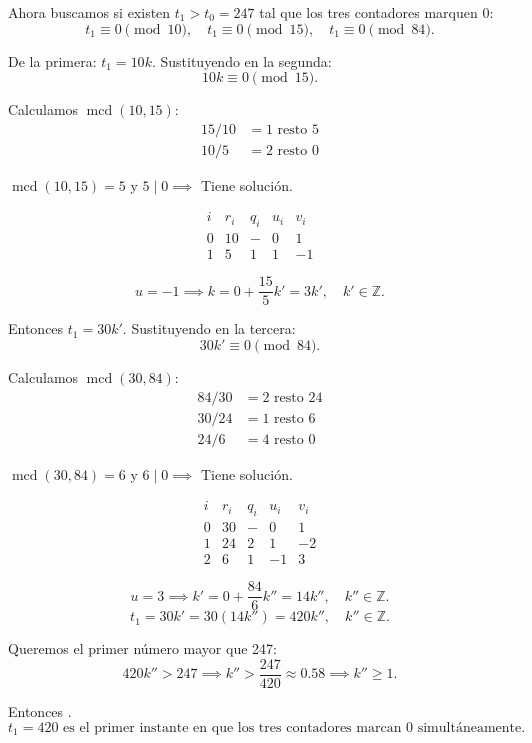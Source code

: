 \documentclass[a4paper,12pt]{article}
\begin{document}
\begin{ejercicio}[title=Ejercicio 41]

Ahora buscamos si existen $t_1 > t_0 = 247$ tal que los tres contadores marquen $0$:
\[
t_1 \equiv 0 \pmod{10}, \quad t_1 \equiv 0 \pmod{15}, \quad t_1 \equiv 0 \pmod{84}.
\]

De la primera: $t_1 = 10 k$. Sustituyendo en la segunda:
\[
10 k \equiv 0 \pmod{15}.
\]

Calculamos \(\operatorname{mcd}(10,15)\):
\begin{align*}
15 / 10 &= 1 \text{ resto } \boxed{5} \\
10 / 5  &= 2 \text{ resto } 0
\end{align*}

\(\operatorname{mcd}(10,15) = 5\) y $5 \mid 0 \implies$ Tiene solución.

\[
\begin{array}{c|c|c|c|c}
i & r_i & q_i & u_i & v_i \\
\hline
0 & 10 & - & 0 & 1 \\
1 & \boxed{5} & 1 & 1 & -1
\end{array}
\]

\[
u = -1 \implies k = 0 + \frac{15}{5} k' = 3 k', \quad k' \in \mathbb{Z}.
\]

Entonces $t_1 = 30 k'$. Sustituyendo en la tercera:
\[
30 k' \equiv 0 \pmod{84}.
\]

Calculamos \(\operatorname{mcd}(30,84)\):
\begin{align*}
84 / 30 &= 2 \text{ resto } 24 \\
30 / 24 &= 1 \text{ resto } \boxed{6} \\
24 / 6 &= 4 \text{ resto } 0
\end{align*}

\(\operatorname{mcd}(30,84) = 6\) y $6 \mid 0 \implies$ Tiene solución.

\[
\begin{array}{c|c|c|c|c}
i & r_i & q_i & u_i & v_i \\
\hline
0 & 30 & - & 0 & 1 \\
1 & 24 & 2 & 1 & -2 \\
2 & \boxed{6} & 1 & -1 & 3
\end{array}
\]

\[
u = 3 \implies k' = 0 + \frac{84}{6} k'' = 14 k'', \quad k'' \in \mathbb{Z}.
\]
\[
t_1 = 30 k' = 30 (14 k'') = 420 k'', \quad k'' \in \mathbb{Z}.
\]

Queremos el primer número mayor que 247:
\[
420 k'' > 247 \implies k'' > \frac{247}{420} \approx 0.58 \implies k'' \ge 1.
\]

Entonces . 
\[
t_1 = 420 \text{ es el primer instante en que los tres contadores marcan 0 simultáneamente}.
\]

\end{ejercicio}
\end{document}
